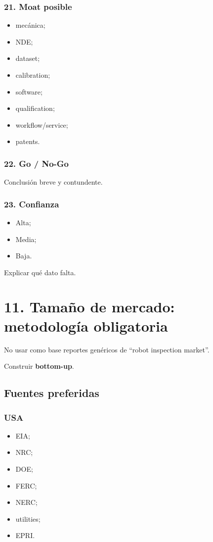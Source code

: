 \documentclass[11pt,a4paper]{article}
\begin{document}
\subsubsection*{21. Moat posible}
\begin{itemize}
\item mecánica;
\item NDE;
\item dataset;
\item calibration;
\item software;
\item qualification;
\item workflow/service;
\item patents.
\end{itemize}


\subsubsection*{22. Go / No-Go}
Conclusión breve y contundente.


\subsubsection*{23. Confianza}
\begin{itemize}
\item Alta;
\item Media;
\item Baja.
\end{itemize}

Explicar qué dato falta.


\section*{11. Tamaño de mercado: metodología obligatoria}
No usar como base reportes genéricos de ``robot inspection market''.

Construir \textbf{bottom-up}.


\subsection*{Fuentes preferidas}

\subsubsection*{USA}
\begin{itemize}
\item EIA;
\item NRC;
\item DOE;
\item FERC;
\item NERC;
\item utilities;
\item EPRI.
\end{itemize}
\end{document}
